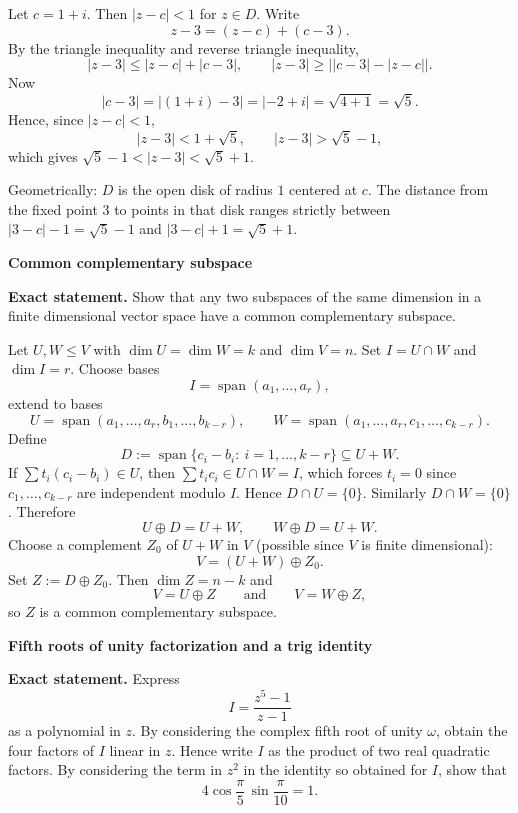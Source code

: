 \begin{solution}
Let \(c=1+i\). Then \(|z-c|<1\) for \(z\in D\). Write
\[
z-3=(z-c)+(c-3).
\]
By the triangle inequality and reverse triangle inequality,
\[
|z-3|\le |z-c|+|c-3|,\qquad |z-3|\ge \bigl||c-3|-|z-c|\bigr|.
\]
Now
\[
|c-3|=|(1+i)-3|=|-2+i|=\sqrt{4+1}=\sqrt5.
\]
Hence, since \(|z-c|<1\),
\[
|z-3|<1+\sqrt5,\qquad |z-3|>\sqrt5-1,
\]
which gives \(\sqrt5-1<|z-3|<\sqrt5+1\).

Geometrically: \(D\) is the open disk of radius \(1\) centered at \(c\). The distance from the fixed point \(3\) to points in that disk ranges strictly between \(|3-c|-1=\sqrt5-1\) and \(|3-c|+1=\sqrt5+1\).
\end{solution}

\begin{problem}[CP-I-0026]
\label{prob:cp-i-0026}
\textbf{Common complementary subspace}

\textbf{Exact statement.}
\hspace*{1.5em}Show that any two subspaces of the same dimension in a finite dimensional vector space have a common complementary subspace.
\end{problem}

\begin{solution}
Let $U,W\le V$ with $\dim U=\dim W=k$ and $\dim V=n$. Set $I=U\cap W$ and $\dim I=r$.
Choose bases
\[
I=\operatorname{span}(a_1,\dots,a_r),
\]
extend to bases
\[
U=\operatorname{span}(a_1,\dots,a_r,b_1,\dots,b_{k-r}),\qquad
W=\operatorname{span}(a_1,\dots,a_r,c_1,\dots,c_{k-r}).
\]
Define
\[
D:=\operatorname{span}\{c_i-b_i:\ i=1,\dots,k-r\}\subseteq U+W.
\]
If $\sum t_i(c_i-b_i)\in U$, then $\sum t_i c_i\in U\cap W=I$, which forces $t_i=0$ since
$c_1,\dots,c_{k-r}$ are independent modulo $I$. Hence $D\cap U=\{0\}$. Similarly $D\cap W=\{0\}$.
Therefore
\[
U\oplus D=U+W,\qquad W\oplus D=U+W.
\]
Choose a complement $Z_0$ of $U+W$ in $V$ (possible since $V$ is finite dimensional):
\[
V=(U+W)\oplus Z_0.
\]
Set $Z:=D\oplus Z_0$. Then $\dim Z=n-k$ and
\[
V=U\oplus Z\qquad\text{and}\qquad V=W\oplus Z,
\]
so $Z$ is a common complementary subspace.
\end{solution}

\begin{problem}[CP-I-0033]
\label{prob:cp-i-0033}
\textbf{Fifth roots of unity factorization and a trig identity}

\textbf{Exact statement.}
\hspace*{1.5em}Express
\[
I=\frac{z^5-1}{z-1}
\]
as a polynomial in \(z\). By considering the complex fifth root of unity \(\omega\), obtain the four factors of \(I\) linear in \(z\).
Hence write \(I\) as the product of two real quadratic factors. By considering the term in \(z^2\) in the identity so obtained for \(I\),
show that
\[
4\cos\frac{\pi}{5}\,\sin\frac{\pi}{10}=1.
\]

\end{problem}

